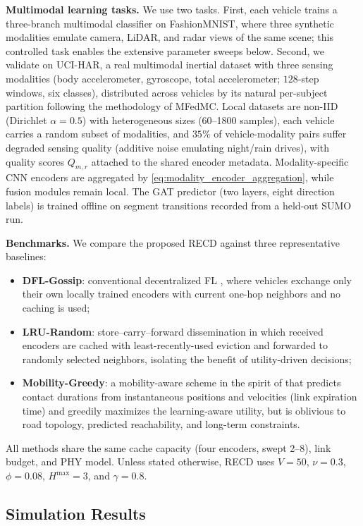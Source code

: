 \textbf{Multimodal learning tasks.}
We use two tasks. First, each vehicle trains a three-branch multimodal
classifier on FashionMNIST, where three synthetic modalities emulate
camera, LiDAR, and radar views of the same scene; this controlled task
enables the extensive parameter sweeps below. Second, we validate on
UCI-HAR, a real multimodal inertial dataset with three sensing modalities
(body accelerometer, gyroscope, total accelerometer; $128$-step windows,
six classes), distributed across vehicles by its natural per-subject
partition following the methodology of MFedMC. Local datasets are non-IID (Dirichlet
$\alpha{=}0.5$) with heterogeneous sizes (60--1800 samples), each vehicle
carries a random subset of modalities, and $35\%$ of vehicle-modality pairs
suffer degraded sensing quality (additive noise emulating night/rain
drives), with quality scores $Q_{m,r}$ attached to the shared encoder
metadata. Modality-specific CNN encoders are aggregated by
\eqref{eq:modality_encoder_aggregation}, while fusion modules remain local.
The GAT predictor (two layers, eight direction labels) is trained offline
on segment transitions recorded from a held-out SUMO run.

\textbf{Benchmarks.}
We compare the proposed RECD against three representative baselines:
\begin{itemize}
\item \textbf{DFL-Gossip}: conventional decentralized FL
\cite{keypaper1}, where vehicles exchange only their own locally trained
encoders with current one-hop neighbors and no caching is used;
\item \textbf{LRU-Random}: store--carry--forward dissemination in which
received encoders are cached with least-recently-used eviction and
forwarded to randomly selected neighbors, isolating the benefit of
utility-driven decisions;
\item \textbf{Mobility-Greedy}: a mobility-aware scheme in the spirit of
\cite{mobility1_tmc} that predicts contact durations from instantaneous
positions and velocities (link expiration time) and greedily maximizes the
learning-aware utility, but is oblivious to road topology, predicted
reachability, and long-term constraints.
\end{itemize}
All methods share the same cache capacity (four encoders, swept 2--8),
link budget, and PHY model. Unless stated otherwise, RECD uses $V{=}50$,
$\nu{=}0.3$, $\phi{=}0.08$, $H^{\max}{=}3$, and $\gamma{=}0.8$.

\subsection{Simulation Results}
\label{subsec:results}

